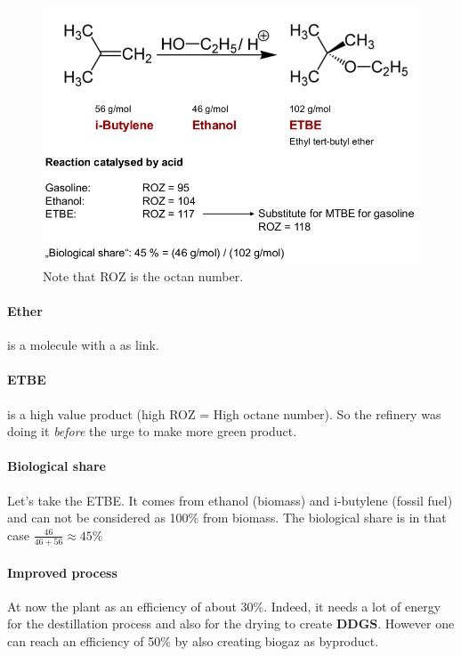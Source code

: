 \documentclass[10pt,a4paper]{article}
\begin{document}
\begin{figure}[h!]
\centering	
\includegraphics[scale=0.5]{Image/iButylene.png}
\caption{Note that ROZ is the octan number.}
\end{figure}

\paragraph{Ether} is a molecule with a  as link.

\paragraph{ETBE} is a high value product (high ROZ = High octane number). So the refinery was doing it \emph{before} the urge to make more green product.

\paragraph{Biological share}Let's take the ETBE. It comes from ethanol (biomass) and i-butylene (fossil fuel) and can not be considered as 100\% from biomass. The biological share is in that case $\frac{46}{46+56} \approx 45 \%$

\paragraph{Improved process}At now the plant as an efficiency of about 30\%. Indeed, it needs a lot of energy for the destillation process and also for the drying to create \textbf{DDGS}. However one can reach an efficiency of 50\% by also creating biogaz as byproduct.
\end{document}
